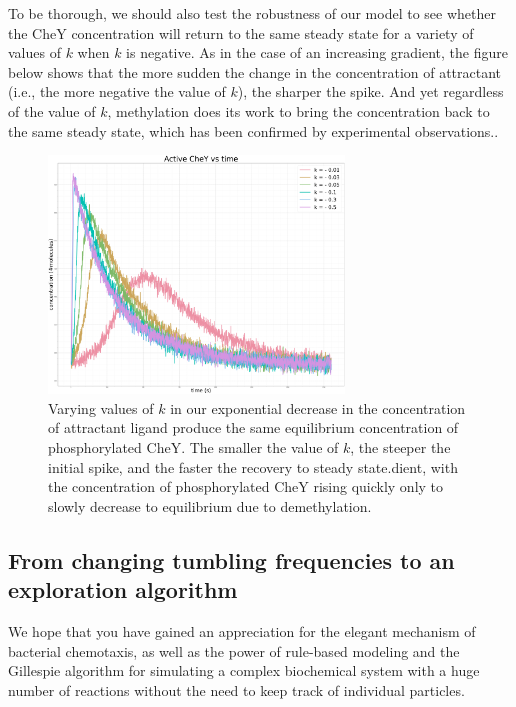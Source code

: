 To be thorough, we should also test the robustness of our model to see whether the CheY concentration will return to the same steady state for a variety of values of $k$ when $k$ is negative. As in the case of an increasing gradient, the figure below shows that the more sudden the change in the concentration of attractant (i.e., the more negative the value of $k$), the sharper the spike. And yet regardless of the value of $k$, methylation does its work to bring the concentration back to the same steady state, which has been confirmed by experimental observations.\citep{Krembel_2015}.

\begin{figure}[h]
\centering
\mySfFamily
\includegraphics[width = 0.7\textwidth]{../images/chemotaxis_tutorial_removal02.png}
\caption{Varying values of $k$ in our exponential decrease in the concentration of attractant ligand produce the same equilibrium concentration of phosphorylated CheY. The smaller the value of $k$, the steeper the initial spike, and the faster the recovery to steady state.dient, with the concentration of phosphorylated CheY rising quickly only to slowly decrease to equilibrium due to demethylation.}
\label{fig:chemotaxis_tutorial_removal02}
\end{figure}

\FloatBarrier
{}
\subsection{From changing tumbling frequencies to an exploration algorithm}

We hope that you have gained an appreciation for the elegant mechanism of bacterial chemotaxis, as well as the power of rule-based modeling and the Gillespie algorithm for simulating a complex biochemical system with a huge number of reactions without the need to keep track of individual particles.

